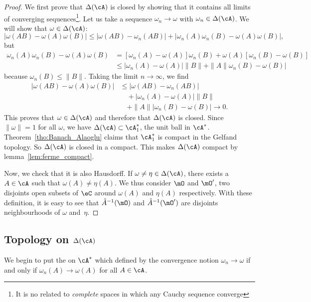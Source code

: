 \begin{proof}
We first prove that $\Delta(\cA)$ is closed by showing that it contains all limits of converging sequences\footnote{It is no related to \emph{complete} spaces in which any Cauchy sequence converge}. Let us take a sequence $\omega_n\to\omega$ with $\omega_n\in\Delta(\cA)$. We will show that $\omega\in\Delta(\cA)$:
\[
| \omega(AB)-\omega(A)\omega(B) | \leq| \omega(AB)-\omega_n(AB) |+| \omega_n(A)\omega_n(B)-\omega(A)\omega(B) |,
\]
but
\[
 \begin{split}
\omega_n(A)\omega_n(B)-\omega(A)\omega(B)&=[\omega_n(A)-\omega(A)]\omega_n(B)+\omega(A)[\omega_n(B)-\omega(B)]\\
        &\leq | \omega_n(A)-\omega(A) |\| B \|+\| A \| \omega_n(B)-\omega(B) |
\end{split}
\]
because $\omega_n(B)\leq \| B \|$. Taking the limit $n\to\infty$, we find
\[
 \begin{split}
| \omega(AB)-\omega(A)\omega(B) |&\leq| \omega(AB)-\omega_n(AB) |\\
        &\quad+| \omega_n(A)-\omega(A) |\| B \|\\
        &\quad+\| A \| |\omega_n(B)-\omega(B) |\to 0.
\end{split}
\]
This proves that $\omega\in\Delta(\cA)$ and therefore that $\Delta(\cA)$ is closed. Since $\| \omega \|=1$ for all $\omega$, we have $\Delta(\cA)\subset\cA_1^*$, the unit ball in $\cA^*$. Theorem~\ref{tho:Banach_Alaoglu} claims that $\cA_1^*$ is compact in the Gelfand topology. So $\Delta(\cA)$ is closed in a compact. This makes $\Delta(\cA)$ compact by lemma~\ref{lem:ferme_compact}.

Now, we check that it is also Hausdorff. If $\omega\neq\eta\in\Delta(\cA)$, there exists a $A\in\cA$ such that $\omega(A)\neq\eta(A)$. We thus consider $\mO$ and $\mO'$, two disjoints open subsets of $\eC$ around $\omega(A)$ and $\eta(A)$ respectively. With these definition, it is easy to see that $\hat A^{-1}(\mO)$ and $\hat A^{-1}(\mO')$ are disjoints neighbourhoods of $\omega$ and~$\eta$.
\end{proof}


\subsection{Topology on \texorpdfstring{$\Delta(\cA)$}{DA}}\label{subsec:topo_Delta}
We begin to put the  on $\cA^*$ which defined by the convergence notion $\omega_n\to\omega$ if and only if $\omega_n(A)\to\omega(A)$ for all $A\in\cA$.

